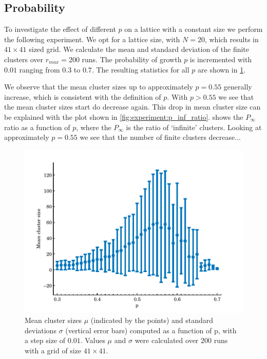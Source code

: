 

\subsection{Probability}
\label{ss:exp:probability}

To investigate the effect of different $p$ on a lattice with a constant size we perform the following experiment. We opt for a lattice size, with $N = 20$, which results in $41 \times 41$ sized grid. We calculate the mean and standard deviation of the finite clusters over $r_{max} = 200$ runs. The probability of growth $p$ is incremented with $0.01$ ranging from $0.3$ to $0.7$. The resulting statistics for all $p$ are shown in \cref{fig:experiment:mean_std_clusters}.

We observe that the mean cluster sizes up to approximately $p = 0.55$ generally increase, which is consistent with the definition of $p$. With $p > 0.55$ we see that the mean cluster sizes start do decrease again. This drop in mean cluster size can be explained with the plot shown in \cref{fig:experiment:p_inf_ratio}.  shows the $P_\infty$ ratio as a function of $p$, where the $P_\infty$ is the ratio of `infinite' clusters. Looking at approximately $p = 0.55$ we see that the number of finite clusters decrease... 

\begin{figure}
	\centering
	\includegraphics[width=\textwidth]{./img/assignment_a_mean_std_p.pdf}
	\caption{Mean cluster sizes $\mu$ (indicated by the points) and standard deviations $\sigma$ (vertical error bars) computed as a function of p, with a step size of $0.01$. Values $\mu$ and $\sigma$ were calculated over $200$ runs with a grid of size $41 \times 41$.}
	\label{fig:experiment:mean_std_clusters}
\end{figure}

